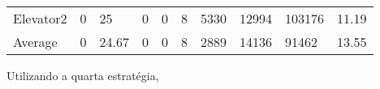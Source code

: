 ﻿\documentclass[a4paper]{article}
\begin{document}
\begin{table}[h]
\begin{tabular}{@{}llllllllll@{}}
Elevator2 & 0        & 25            & 0           & 0                                                               & 8                                                                  & 5330                                                         & 12994                                                 & 103176                                                   & 11.19         \\
Average   & 0     & 24.67         & 0        & 0                                                               & 8                                                              & 2889                                                         & 14136                                                 &  91462                                                  & 13.55         \\ \bottomrule
\end{tabular}
\end{table}

\newpage

Utilizando a quarta estratégia,
\end{document}
